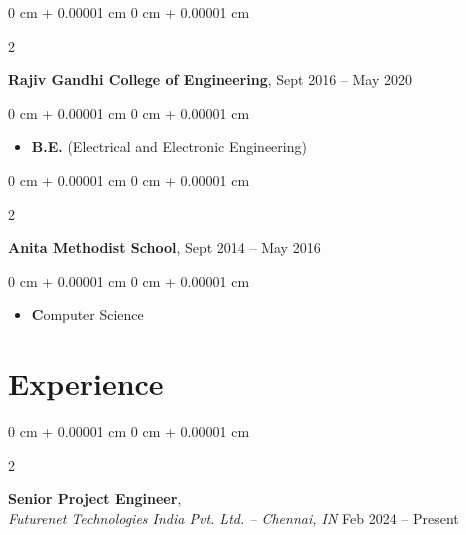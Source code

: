\documentclass[10pt, letterpaper]{article}
\newenvironment{highlights}{
    \begin{itemize}[
        topsep=0.10 cm,
        parsep=0.10 cm,
        partopsep=0pt,
        itemsep=0pt,
        leftmargin=0 cm + 10pt
    ]
}{
    \end{itemize}
} %
\newenvironment{onecolentry}{
    \begin{adjustwidth}{
        0 cm + 0.00001 cm
    }{
        0 cm + 0.00001 cm
    }
}{
    \end{adjustwidth}
} %
\newenvironment{twocolentry}[2][]{
    \onecolentry
    \def\secondColumn{#2}
    \setcolumnwidth{\fill, 4.5 cm}
    \begin{paracol}{2}
}{
    \switchcolumn \raggedleft \secondColumn
    \end{paracol}
    \endonecolentry
} %
\begin{document}
        
        \begin{twocolentry}{
            Sept 2016 – May 2020
        }
            \textbf{Rajiv Gandhi College of Engineering},\end{twocolentry}

        \vspace{0.10 cm}
        \begin{onecolentry}
            \begin{highlights}
                \item\textbf \textbf{B.E.}  (Electrical and Electronic Engineering)
            \end{highlights}
        \end{onecolentry}

     \vspace{0.1 cm}
      
      \begin{twocolentry}{
            Sept 2014 – May 2016
        }
            \textbf{Anita Methodist School},\end{twocolentry}

        \vspace{0.10 cm}
        \begin{onecolentry}
            \begin{highlights}
                \item\textbf \textbf Computer Science
            \end{highlights}
        \end{onecolentry}
\vspace{0.2 cm}


    
    \section{Experience}



        
        \begin{twocolentry}{
            Feb 2024 – Present
        }
            \textbf{Senior Project Engineer},\\ \textit{Futurenet Technologies India Pvt. Ltd. -- Chennai, IN}\end{twocolentry}
\end{document}
